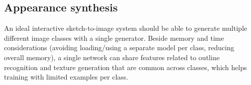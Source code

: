 \vspace{4mm}
\subsection{Appearance synthesis}
\label{sec:appearance}
An ideal interactive sketch-to-image system  should be able to generate multiple different image classes with a single generator. 
Beside memory and time considerations (avoiding loading/using a separate model per class, reducing overall memory), a single network can share features related to outline recognition and texture generation that are common across classes, which helps training with limited examples per class. %

